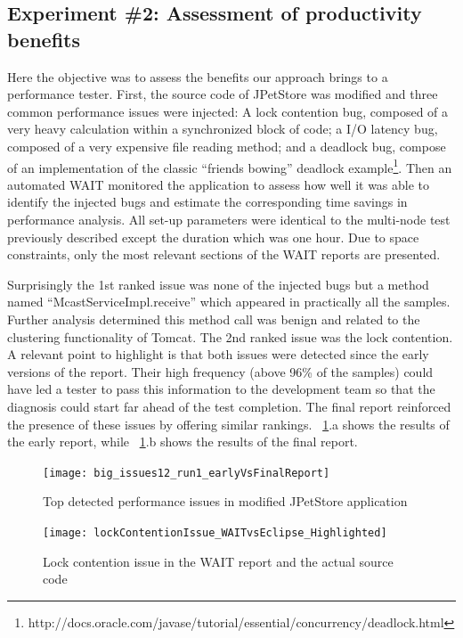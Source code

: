 \documentclass[runningheads,a4paper]{llncs}
\begin{document}
\vspace{-5pt}
\subsection{Experiment \#2: Assessment of productivity benefits}
\vspace{-2pt}

Here the objective was to assess the benefits our approach brings to a
performance tester. First, the source code of JPetStore was modified and three
common performance issues were injected: A lock contention bug, composed of a
very heavy calculation within a synchronized block of code; a I/O latency bug, 
composed of a very expensive file reading method; and a deadlock bug, compose
of an implementation of the classic ``friends bowing'' deadlock
example\footnote{http://docs.oracle.com/javase/tutorial/essential/concurrency/deadlock.html}.
Then an automated WAIT monitored the application to assess how well
it was able to identify the injected bugs and estimate the corresponding time
savings in performance analysis. All set-up parameters were identical to
the multi-node test previously described except the duration which
was one hour. Due to space constraints, only the most relevant sections
of the WAIT reports are presented.

Surprisingly the 1st ranked issue was none of the injected bugs but a method
named ``McastServiceImpl.receive'' which appeared in practically all the
samples. Further analysis determined this method call was benign and related
to the clustering functionality of Tomcat. The 2nd ranked issue was the lock
contention. A relevant point to highlight is that both issues were detected
since the early versions of the report. Their high frequency (above
96\% of the samples) could have led a tester to pass this
information to the development team so that the diagnosis could start far ahead
of the test completion. The final report reinforced the presence of these issues 
by offering similar rankings. \figurename ~\ref{fig_run1_bugs12}.a shows the
results of the early report, while ~\ref{fig_run1_bugs12}.b shows the results of the final report.

\begin{figure}[!h]
\centering
\texttt{[image: big\_issues12\_run1\_earlyVsFinalReport]}
\caption{Top detected performance issues in modified JPetStore application}
\label{fig_run1_bugs12}
\end{figure}

\begin{figure}[!h]
\centering
\texttt{[image: lockContentionIssue\_WAITvsEclipse\_Highlighted]}
\caption{Lock contention issue in the WAIT report and the actual source code}
\label{fig_issue2_vs_code}
\end{figure}
\end{document}
